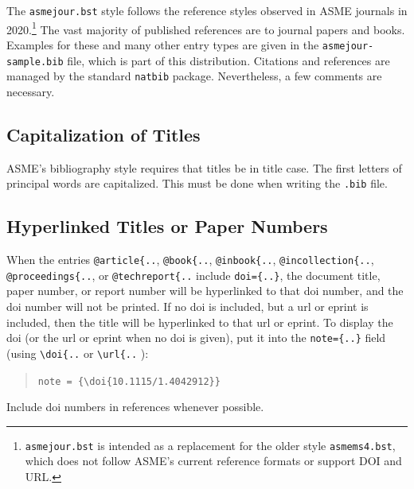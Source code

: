 \documentclass[subscriptcorrection,upint,varvw,mathalfa=cal=euler,barcolor=black,balance,hyphenate,french,pdf-a,nolists]{asmejour}
\begin{document}
The {\upshape\texttt{asmejour.bst}}  style follows the reference styles observed in ASME journals in 2020.\footnote{\texttt{asmejour.bst} is intended as a replacement for the older style \texttt{asmems4.bst}, which does not follow ASME's current reference formats or support DOI and URL.} The vast majority of published references are to journal papers and books. Examples for these and many other entry types are given in the \texttt{asmejour-sample.bib} file, which is part of this distribution. Citations and references are managed by the standard \texttt{natbib} package.
Nevertheless, a few comments are necessary.

\subsection{Capitalization of Titles} ASME's bibliography style requires that titles be in title case. The first letters of principal words are capitalized. This must be done when writing the \texttt{.bib} file.

\subsection{Hyperlinked Titles or Paper Numbers} When the entries \verb|@article{..|, \verb|@book{..|, \verb|@inbook{..|, \verb|@incollection{..|, \verb|@proceedings{..|, or \verb|@techreport{..| include \verb|doi={..}|, the document title, paper number, or report number will be hyperlinked to that doi number, and the doi number will not be printed. If no doi is included, but a url or eprint is included, then the title will be hyperlinked to that url or eprint. To display the doi (or the url or eprint when no doi is given), put it into the \verb|note={..}| field (using \verb|\doi{..| or \verb|\url{..| ):
\begin{quote}
\verb|note = {\doi{10.1115/1.4042912}}|
\end{quote}
Include doi numbers in references whenever possible.



\begin{table}[t]
\caption{A simple table\label{tab:1}}
%
\end{table}
\end{document}
